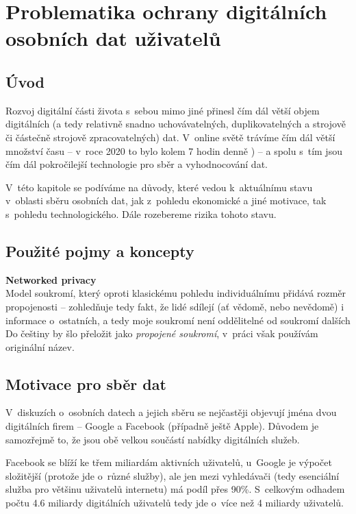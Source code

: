 \chapter{Problematika ochrany digitálních osobních dat uživatelů}

\section{Úvod}
Rozvoj digitální části života s~sebou mimo jiné přinesl čím dál větší objem digitálních (a tedy relativně snadno uchovávatelných, duplikovatelných a strojově či částečně strojově zpracovatelných) dat. V~online světě trávíme čím dál větší množství času -- v~roce 2020 to bylo kolem 7 hodin denně \citep{digital-2021-report}) -- a spolu s~tím jsou čím dál pokročilejší technologie pro sběr a vyhodnocování dat.

V~této kapitole se podíváme na důvody, které vedou k~aktuálnímu stavu v~oblasti sběru osobních dat, jak z~pohledu ekonomické a jiné motivace, tak s~pohledu technologického. Dále rozebereme rizika tohoto stavu.

\section{Použité pojmy a koncepty}

\textbf{Networked privacy}\\
Model soukromí, který oproti klasickému pohledu individuálnímu přidává rozměr propojenosti -- zohledňuje tedy fakt, že lidé sdílejí (ať vědomě, nebo nevědomě) i informace o~ostatních, a tedy moje soukromí není oddělitelné od soukromí dalších\citep{networked-privacy}\\
Do češtiny by šlo přeložit jako \textit{propojené soukromí}, v~práci však používám originální název.

\section{Motivace pro sběr dat}

V~diskuzích o~osobních datech a jejich sběru se nejčastěji objevují jména dvou digitálních firem -- Google a Facebook (případně ještě Apple). Důvodem je samozřejmě to, že jsou obě velkou součástí nabídky digitálních služeb.

Facebook se blíží ke třem miliardám aktivních uživatelů\citep{facebook-active-users}, u~Google je výpočet složitější (protože jde o~různé služby), ale jen mezi vyhledávači (tedy esenciální služba pro většinu uživatelů internetu) má podíl přes 90\%\citep{google-search}. S~celkovým odhadem počtu 4.6 miliardy digitálních uživatelů \citep{digital-2021-report} tedy jde o~více než 4 miliardy uživatelů.

